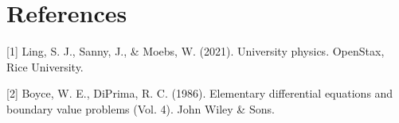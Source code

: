\documentclass{article}
\begin{document}
\newpage

\centering \section{References}

[1] Ling, S. J., Sanny, J., \& Moebs, W. (2021). University physics. OpenStax, Rice University.

\vspace{14pt}

[2] Boyce, W. E., DiPrima, R. C. (1986). Elementary differential equations and boundary value problems (Vol. 4). John Wiley \& Sons. 
\end{document}
